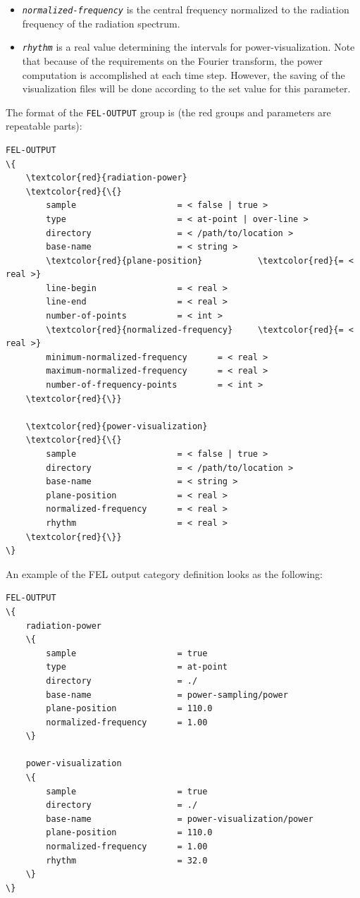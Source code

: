 \begin{enumerate}
\begin{itemize}
	\item {\tt \small \em normalized-frequency} is the central frequency normalized to the radiation frequency of the radiation spectrum.
	\item {\tt \small \em rhythm} is a real value determining the intervals for power-visualization. Note that because of the requirements on the Fourier transform, the power computation is accomplished at each time step. However, the saving of the visualization files will be done according to the set value for this parameter.
\end{itemize}
%
\end{enumerate}

The format of the \texttt{FEL-OUTPUT} group is (the red groups and parameters are repeatable parts):
\begin{Verbatim}[frame=single, fontsize=\small, tabsize=4, fontfamily=courier, fontseries=b, commandchars=\\\{\}, obeytabs]
FEL-OUTPUT
\{
	\textcolor{red}{radiation-power}
	\textcolor{red}{\{}
		sample					  = < false | true >
		type					  = < at-point | over-line >
		directory				  = < /path/to/location >
		base-name				  = < string >
		\textcolor{red}{plane-position}  		  \textcolor{red}{= < real >}
		line-begin				  = < real >
		line-end				  = < real >
		number-of-points		  = < int >
		\textcolor{red}{normalized-frequency}	  \textcolor{red}{= < real >}
		minimum-normalized-frequency	  = < real >
		maximum-normalized-frequency	  = < real >
		number-of-frequency-points		  = < int >
	\textcolor{red}{\}}

	\textcolor{red}{power-visualization}
	\textcolor{red}{\{}
		sample					  = < false | true >
		directory				  = < /path/to/location >
		base-name				  = < string >
		plane-position			  = < real >
		normalized-frequency	  = < real >
		rhythm					  = < real >
	\textcolor{red}{\}}
\}
\end{Verbatim}
An example of the FEL output category definition looks as the following:
\begin{snugshade}
\begin{Verbatim}[fontsize=\small, tabsize=4, fontfamily=courier, fontseries=b, commandchars=\\\{\}, obeytabs]
FEL-OUTPUT
\{
	radiation-power
	\{
		sample					  = true
		type					  = at-point
		directory				  = ./
		base-name				  = power-sampling/power
		plane-position			  = 110.0
		normalized-frequency	  = 1.00
	\}
	
	power-visualization
	\{
		sample					  = true
		directory				  = ./
		base-name				  = power-visualization/power
		plane-position			  = 110.0
		normalized-frequency	  = 1.00
		rhythm					  = 32.0
	\}
\}
\end{Verbatim}
\end{snugshade} 